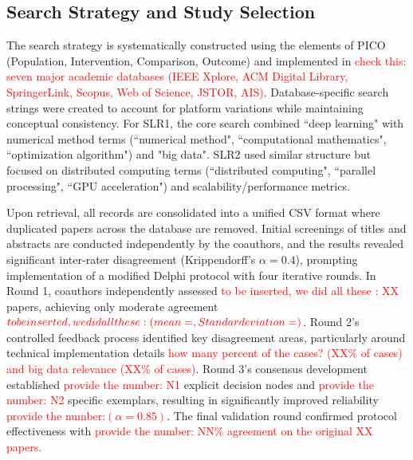 \documentclass[acmsmall]{acmart}
\newcommand{\ATM}[1]{\textcolor{red}{#1}}
\begin{document}

\subsection{Search Strategy and Study Selection}\label{subsec:search-strategy-and-study-selection}
The search strategy is systematically constructed using the elements of PICO (Population, Intervention, Comparison, Outcome) and implemented in \ATM{check this: seven major academic databases (IEEE Xplore, ACM Digital Library, SpringerLink, Scopus, Web of Science, JSTOR, AIS)}. Database-specific search strings were created to account for platform variations while maintaining conceptual consistency. For SLR1, the core search combined ``deep learning" with numerical method terms (``numerical method", ``computational mathematics", ``optimization algorithm") and "big data". SLR2 used similar structure but focused on distributed computing terms (``distributed computing", ``parallel processing", ``GPU acceleration") and scalability/performance metrics.

Upon retrieval, all records are consolidated into a unified CSV format where duplicated papers across the database are removed. Initial screenings of titles and abstracts are conducted independently by the coauthors, and the results revealed significant inter-rater disagreement (Krippendorff's $\alpha = 0.4$), prompting implementation of a modified Delphi protocol with four iterative rounds. In Round 1, coauthors independently assessed \ATM{to be inserted, we did all these : XX} papers, achieving only moderate agreement $\ATM{to be inserted, we did all these :(mean= , Standardeviation=)}$. Round 2's controlled feedback process identified key disagreement areas, particularly around technical implementation details \ATM{how many percent of the cases? (XX\% of cases) and big data relevance (XX\% of cases)}. Round 3's consensus development established \ATM{provide the number: N1} explicit decision nodes and \ATM{provide the number: N2} specific exemplars, resulting in significantly improved reliability \ATM{provide the number:$(\alpha = 0.85)$}. The final validation round confirmed protocol effectiveness with \ATM{provide the number: NN\% agreement on the original XX papers.}
\end{document}
